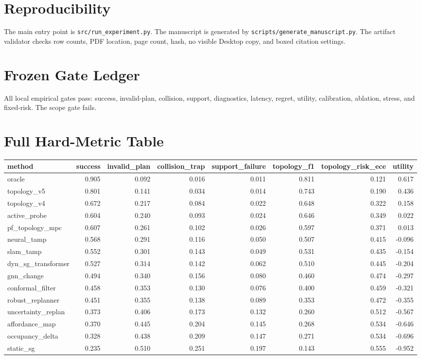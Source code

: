 \documentclass{article}
\begin{document}
\section{Reproducibility}
The main entry point is \texttt{src/run\_experiment.py}. The manuscript is generated by \texttt{scripts/generate\_manuscript.py}. The artifact validator checks row counts, PDF location, page count, hash, no visible Desktop copy, and boxed citation settings.

\appendix
\section{Frozen Gate Ledger}
All local empirical gates pass: success, invalid-plan, collision, support, diagnostics, latency, regret, utility, calibration, ablation, stress, and fixed-risk. The scope gate fails.

\section{Full Hard-Metric Table}
\begingroup\scriptsize\setlength{\tabcolsep}{3pt}
\begin{longtable}{@{}lrrrrrrr@{}}
\toprule
method & success & invalid\_plan & collision\_trap & support\_failure & topology\_f1 & topology\_risk\_ece & utility \\
\midrule
oracle & 0.905 & 0.092 & 0.016 & 0.011 & 0.811 & 0.121 & 0.617 \\
topology\_v5 & 0.801 & 0.141 & 0.034 & 0.014 & 0.743 & 0.190 & 0.436 \\
topology\_v4 & 0.672 & 0.217 & 0.084 & 0.022 & 0.648 & 0.322 & 0.158 \\
active\_probe & 0.604 & 0.240 & 0.093 & 0.024 & 0.646 & 0.349 & 0.022 \\
pf\_topology\_mpc & 0.607 & 0.261 & 0.102 & 0.026 & 0.597 & 0.371 & 0.013 \\
neural\_tamp & 0.568 & 0.291 & 0.116 & 0.050 & 0.507 & 0.415 & -0.096 \\
slam\_tamp & 0.552 & 0.301 & 0.143 & 0.049 & 0.531 & 0.435 & -0.154 \\
dyn\_sg\_transformer & 0.527 & 0.314 & 0.142 & 0.062 & 0.510 & 0.445 & -0.204 \\
gnn\_change & 0.494 & 0.340 & 0.156 & 0.080 & 0.460 & 0.474 & -0.297 \\
conformal\_filter & 0.458 & 0.353 & 0.130 & 0.076 & 0.400 & 0.459 & -0.321 \\
robust\_replanner & 0.451 & 0.355 & 0.138 & 0.089 & 0.353 & 0.472 & -0.355 \\
uncertainty\_replan & 0.373 & 0.406 & 0.173 & 0.132 & 0.260 & 0.512 & -0.567 \\
affordance\_map & 0.370 & 0.445 & 0.204 & 0.145 & 0.268 & 0.534 & -0.646 \\
occupancy\_delta & 0.328 & 0.438 & 0.209 & 0.147 & 0.271 & 0.534 & -0.696 \\
static\_sg & 0.235 & 0.510 & 0.251 & 0.197 & 0.143 & 0.555 & -0.952 \\
\bottomrule
\end{longtable}
\endgroup
\end{document}
